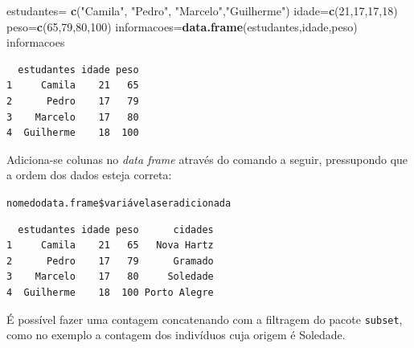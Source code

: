 \documentclass[12pt,brazil,oneside]{book}
\newenvironment{Shaded}{\begin{snugshade}}{\end{snugshade}}
\newcommand{\DecValTok}[1]{\textcolor[rgb]{0.00,0.00,0.81}{#1}}
\newcommand{\KeywordTok}[1]{\textcolor[rgb]{0.13,0.29,0.53}{\textbf{#1}}}
\newcommand{\NormalTok}[1]{#1}
\newcommand{\OperatorTok}[1]{\textcolor[rgb]{0.81,0.36,0.00}{\textbf{#1}}}
\newcommand{\StringTok}[1]{\textcolor[rgb]{0.31,0.60,0.02}{#1}}
\begin{document}
\begin{Shaded}
\begin{Highlighting}[]
\NormalTok{estudantes=}\StringTok{ }\KeywordTok{c}\NormalTok{(}\StringTok{"Camila"}\NormalTok{, }\StringTok{"Pedro"}\NormalTok{, }\StringTok{"Marcelo"}\NormalTok{,}\StringTok{"Guilherme"}\NormalTok{)}
\NormalTok{idade=}\KeywordTok{c}\NormalTok{(}\DecValTok{21}\NormalTok{,}\DecValTok{17}\NormalTok{,}\DecValTok{17}\NormalTok{,}\DecValTok{18}\NormalTok{)}
\NormalTok{peso=}\KeywordTok{c}\NormalTok{(}\DecValTok{65}\NormalTok{,}\DecValTok{79}\NormalTok{,}\DecValTok{80}\NormalTok{,}\DecValTok{100}\NormalTok{)}
\NormalTok{informacoes=}\KeywordTok{data.frame}\NormalTok{(estudantes,idade,peso)}
\NormalTok{informacoes}
\end{Highlighting}
\end{Shaded}

\begin{verbatim}
  estudantes idade peso
1     Camila    21   65
2      Pedro    17   79
3    Marcelo    17   80
4  Guilherme    18  100
\end{verbatim}

Adiciona-se colunas no \emph{data frame} através do comando a seguir, pressupondo que a ordem dos dados esteja correta:

\texttt{nomedodata.frame\$variávelaseradicionada}

\begin{Shaded}
\end{Shaded}

\begin{verbatim}
  estudantes idade peso      cidades
1     Camila    21   65   Nova Hartz
2      Pedro    17   79      Gramado
3    Marcelo    17   80     Soledade
4  Guilherme    18  100 Porto Alegre
\end{verbatim}

É possível fazer uma contagem concatenando com a filtragem do pacote \texttt{subset}, como no exemplo a contagem dos indivíduos cuja origem é Soledade.

\begin{Shaded}
\end{Shaded}
\end{document}
